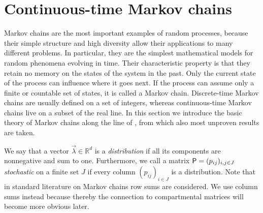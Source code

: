 \documentclass[smallextended]{svjour3}
\newcommand{\R}{\mathbb{R}}
\renewcommand{\P}{\mathbb{P}}
\begin{document}
\section{Continuous-time Markov chains\label{sec:Markov}}

Markov chains are the most important examples of random processes, because their simple structure and high diversity allow their applications to many different problems.
In particular, they are the simplest mathematical models for random phenomena evolving in time.
Their characteristic property is that they retain no memory on the states of the system in the past.
Only the current state of the process can influence where it goes next.
If the process can assume only a finite or countable set of states, it is called a Markov chain.
Discrete-time Markov chains are usually defined on a set of integers, whereas continuous-time Markov chains live on a subset of the real line.
In this section we introduce the basic theory of Markov chains along the line of \citet{Norris1997}, from which also most unproven results are taken.



We say that a vector $\vec{\lambda}\in\R^d$ is a \emph{distribution} if all its components are nonnegative and sum to one. Furthermore, we call a matrix $\mathsf{P}=(p_{ij})_{i,j\in J}$ \emph{stochastic} on a finite set $J$ if every column $(p_{ij})_{i\in J}$ is a distribution.
Note that in standard literature on Markov chains row sums are considered.
We use column sums instead because thereby the connection to compartmental matrices will become more obvious later.
\end{document}
